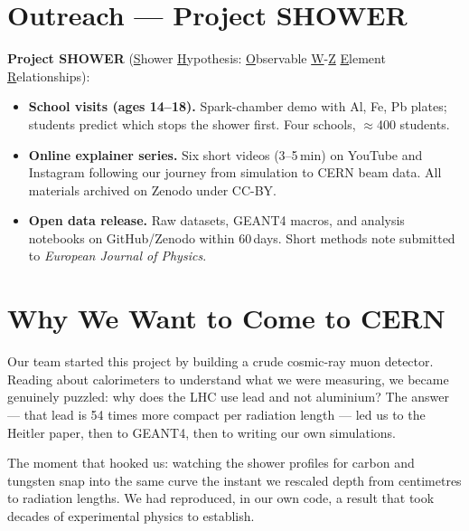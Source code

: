 \documentclass[11pt,a4paper]{article}
\begin{document}
\section{Outreach --- Project SHOWER}
\label{sec:outreach}

\textbf{Project SHOWER}
(\underline{S}hower \underline{H}ypothesis:
\underline{O}bservable \underline{W}-\underline{Z}
\underline{E}lement \underline{R}elationships):

\begin{itemize}[leftmargin=2em, itemsep=4pt]
  \item \textbf{School visits (ages 14--18).}
        Spark-chamber demo with Al, Fe, Pb plates; students predict which
        stops the shower first.  Four schools, $\approx$400 students.

  \item \textbf{Online explainer series.}
        Six short videos (3--5\,min) on YouTube and Instagram following our
        journey from simulation to CERN beam data.
        All materials archived on Zenodo under CC-BY.

  \item \textbf{Open data release.}
        Raw datasets, GEANT4 macros, and analysis notebooks on
        GitHub/Zenodo within 60\,days.  Short methods note submitted to
        \textit{European Journal of Physics}.
\end{itemize}

\section{Why We Want to Come to CERN}
\label{sec:motivation}

Our team started this project by building a crude cosmic-ray muon detector.
Reading about calorimeters to understand what we were measuring, we became
genuinely puzzled: why does the LHC use lead and not aluminium?
The answer --- that lead is 54 times more compact per radiation length ---
led us to the Heitler paper, then to GEANT4, then to writing our own
simulations.

The moment that hooked us: watching the shower profiles for carbon and
tungsten snap into the same curve the instant we rescaled depth from
centimetres to radiation lengths.  We had reproduced, in our own code, a
result that took decades of experimental physics to establish.
\end{document}

